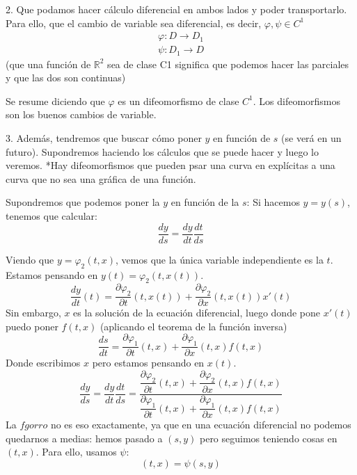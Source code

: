 2. Que podamos hacer cálculo diferencial en ambos lados y poder transportarlo.
Para ello, que el cambio de variable sea diferencial, es decir, $\varphi, \psi \in C^1$
\begin{gather*}
    \varphi : D\rightarrow D_1 \\
    \psi : D_1 \rightarrow D
\end{gather*}
(que una función de $\mathbb{R}^2$ sea de clase C1 significa que podemos hacer las parciales y que las dos son continuas)

Se resume diciendo que $\varphi$ es un difeomorfismo de clase $C^1$.
Los difeomorfismos son los buenos cambios de variable.

3. Además, tendremos que buscar cómo poner $y$ en función de $s$ (se verá en un futuro).
Supondremos haciendo los cálculos que se puede hacer y luego lo veremos.
*Hay difeomorfismos que pueden psar una curva en explícitas a una curva que no sea una gráfica de una función.


Supondremos que podemos poner la $y$ en función de la $s$:
Si hacemos $y=y(s)$, tenemos que calcular:
\begin{equation*}
    \dfrac{dy}{ds} = \dfrac{dy}{dt}\dfrac{dt}{ds}
\end{equation*}

Viendo que $y = \varphi_2(t,x)$, vemos que la única variable independiente es la $t$.
Estamos pensando en $y(t) = \varphi_2(t,x(t))$.
\begin{equation*}
    \dfrac{dy}{dt}(t) = \dfrac{\partial \varphi_2}{\partial t}(t,x(t)) + \dfrac{\partial\varphi_2}{\partial x}(t,x(t)) x'(t)
\end{equation*}
Sin embargo, $x$ es la solución de la ecuación diferencial, luego donde pone $x'(t)$ puedo poner $f(t,x)$ (aplicando el teorema de la función inversa)
\begin{equation*}
    \dfrac{ds}{dt} = \dfrac{\partial\varphi_1}{\partial t}(t,x) + \dfrac{\partial\varphi_1}{\partial x}(t,x) f(t,x)
\end{equation*}
Donde escribimos $x$ pero estamos pensando en $x(t)$.
\begin{equation*}
    \dfrac{dy}{ds} = \dfrac{dy}{dt}\dfrac{dt}{ds} = \dfrac{\dfrac{\partial\varphi_2}{\partial t}(t,x) + \dfrac{\partial\varphi_2}{\partial x}(t,x)f(t,x)}{\dfrac{\partial\varphi_1}{\partial t}(t,x) + \dfrac{\partial\varphi_1}{\partial x}(t,x) f(t,x)} 
\end{equation*}
La $fgorro$ no es eso exactamente, ya que en una ecuación diferencial no podemos quedarnos a medias: hemos pasado a $(s,y)$ pero seguimos teniendo cosas en $(t,x)$.
Para ello, usamos $\psi$:
\begin{equation*}
    (t,x) = \psi(s,y)
\end{equation*}

